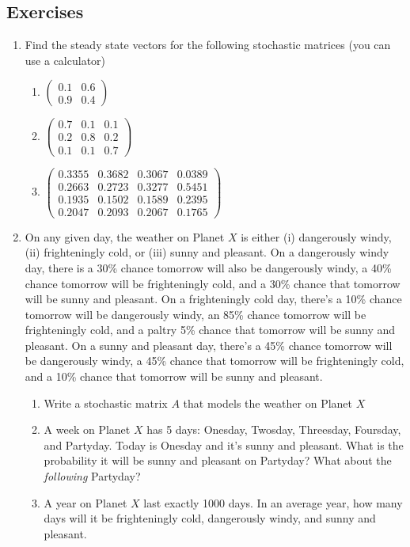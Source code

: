 \documentclass[12pt]{article}
\numberwithin{equation}{subsection}
\numberwithin{figure}{subsection}
\theoremstyle{note}
\begin{document}
\subsection{Exercises}

\begin{enumerate}[label=\arabic*.]
	\item Find the steady state vectors for the following stochastic matrices (you can use a calculator)
	
	\begin{enumerate}
		\item $\begin{pmatrix} 0.1 & 0.6 \\ 0.9 & 0.4 \end{pmatrix}$
		\item $\begin{pmatrix} 0.7 & 0.1 & 0.1 \\ 0.2 & 0.8 & 0.2 \\ 0.1 & 0.1 & 0.7 \end{pmatrix}$
		\item $\begin{pmatrix} 0.3355 & 0.3682 & 0.3067 & 0.0389 \\ 0.2663 & 0.2723 & 0.3277 & 0.5451 \\ 0.1935 & 0.1502 & 0.1589 & 0.2395 \\ 0.2047 & 0.2093 & 0.2067 & 0.1765 \end{pmatrix}$
	\end{enumerate}
	
	\item On any given day, the weather on Planet $X$ is either (i) dangerously windy, (ii) frighteningly cold, or (iii) sunny and pleasant. On a dangerously windy day, there is a 30\% chance tomorrow will also be dangerously windy, a 40\% chance tomorrow will be frighteningly cold, and a 30\% chance that tomorrow will be sunny and pleasant. On a frighteningly cold day, there's a 10\% chance tomorrow will be dangerously windy, an 85\% chance tomorrow will be frighteningly cold, and a paltry 5\% chance that tomorrow will be sunny and pleasant. On a sunny and pleasant day, there's a 45\% chance tomorrow will be dangerously windy, a 45\% chance that tomorrow will be frighteningly cold, and a 10\% chance that tomorrow will be sunny and pleasant.
	
	\begin{enumerate}
		\item Write a stochastic matrix $A$ that models the weather on Planet $X$
		\item A week on Planet $X$ has 5 days: Onesday, Twosday, Threesday, Foursday, and Partyday. Today is Onesday and it's sunny and pleasant. What is the probability it will be sunny and pleasant on Partyday? What about the \textit{following} Partyday?
		\item A year on Planet $X$ last exactly 1000 days. In an average year, how many days will it be frighteningly cold, dangerously windy, and sunny and pleasant. 
	

\end{enumerate}
\end{enumerate}
\end{document}
